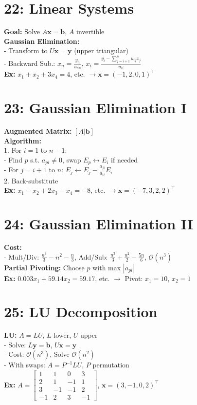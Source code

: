 \documentclass[9pt]{article}
\begin{document}
\begin{multicols}{2}
\section*{22: Linear Systems}
\textbf{Goal:} Solve $A\mathbf{x} = \mathbf{b}$, $A$ invertible \\
\textbf{Gaussian Elimination:} \\
- Transform to $U\mathbf{x} = \mathbf{y}$ (upper triangular) \\
- Backward Sub.: $x_n = \frac{y_n}{u_{nn}}$, $x_i = \frac{y_i - \sum_{j=i+1}^n u_{ij}x_j}{u_{ii}}$ \\
\textbf{Ex:} $x_1+x_2+3x_4=4$, etc. $\to \mathbf{x} = (-1, 2, 0, 1)^\top$

\section*{23: Gaussian Elimination I}
\textbf{Augmented Matrix:} $[A|\mathbf{b}]$ \\
\textbf{Algorithm:} \\
1. For $i=1$ to $n-1$: \\
   - Find $p$ s.t. $a_{pi} \neq 0$, swap $E_p \leftrightarrow E_i$ if needed \\
   - For $j=i+1$ to $n$: $E_j \leftarrow E_j - \frac{a_{ji}}{a_{ii}}E_i$ \\
2. Back-substitute \\
\textbf{Ex:} $x_1-x_2+2x_3-x_4=-8$, etc. $\to \mathbf{x} = (-7, 3, 2, 2)^\top$

\section*{24: Gaussian Elimination II}
\textbf{Cost:} \\
- Mult/Div: $\frac{n^3}{3} - n^2 - \frac{n}{3}$, Add/Sub: $\frac{n^3}{3} + \frac{n^2}{2} - \frac{5n}{6}$, $\mathcal{O}(n^3)$ \\
\textbf{Partial Pivoting:} Choose $p$ with max $|a_{pi}|$ \\
\textbf{Ex:} $0.003x_1+59.14x_2=59.17$, etc. $\to$ Pivot: $x_1=10$, $x_2=1$

\section*{25: LU Decomposition}
\textbf{LU:} $A = LU$, $L$ lower, $U$ upper \\
- Solve: $L\mathbf{y} = \mathbf{b}$, $U\mathbf{x} = \mathbf{y}$ \\
- Cost: $\mathcal{O}(n^3)$, Solve $\mathcal{O}(n^2)$ \\
- With swaps: $A = P^{-1}LU$, $P$ permutation \\
\textbf{Ex:} $A = \begin{bmatrix} 1 & 1 & 0 & 3 \\ 2 & 1 & -1 & 1 \\ 3 & -1 & -1 & 2 \\ -1 & 2 & 3 & -1 \end{bmatrix}$, $\mathbf{x} = (3, -1, 0, 2)^\top$


\end{multicols}
\end{document}
